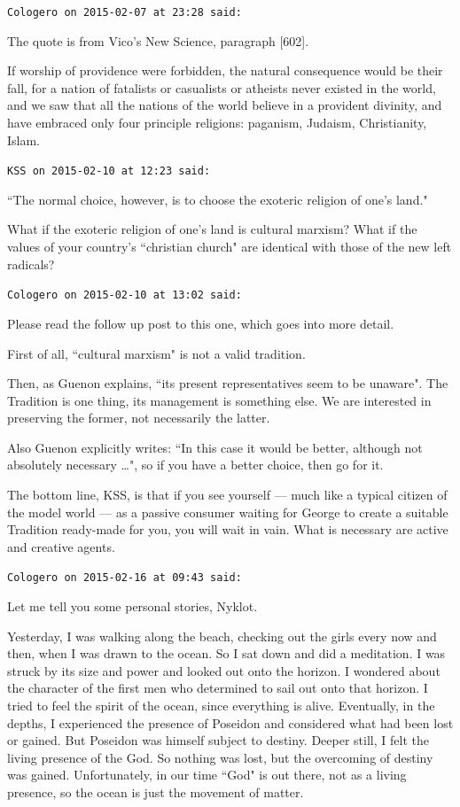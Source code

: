 \begin{footnotesize}
\begin{sffamily}
\texttt{Cologero on 2015-02-07 at 23:28 said: }

The quote is from Vico's New Science, paragraph [602].

\begin{quotex}
If worship of providence were forbidden, the natural consequence would be their fall, for a nation of fatalists or casualists or atheists never existed in the world, and we saw that all the nations of the world believe in a provident divinity, and have embraced only four principle religions: paganism, Judaism, Christianity, Islam. 

\end{quotex}

\hfill

\texttt{KSS on 2015-02-10 at 12:23 said: }

``The normal choice, however, is to choose the exoteric religion of one's land." 

What if the exoteric religion of one's land is cultural marxism? What if the values of your country's ``christian church" are identical with those of the new left radicals?


\hfill

\texttt{Cologero on 2015-02-10 at 13:02 said: }

Please read the follow up post to this one, which goes into more detail.

First of all, ``cultural marxism" is not a valid tradition.

Then, as Guenon explains, ``its present representatives seem to be unaware". The Tradition is one thing, its management is something else. We are interested in preserving the former, not necessarily the latter.

Also Guenon explicitly writes: ``In this case it would be better, although not absolutely necessary …", so if you have a better choice, then go for it.

The bottom line, KSS, is that if you see yourself — much like a typical citizen of the model world — as a passive consumer waiting for George to create a suitable Tradition ready-made for you, you will wait in vain. What is necessary are active and creative agents.


\hfill

\texttt{Cologero on 2015-02-16 at 09:43 said: }

Let me tell you some personal stories, Nyklot.

Yesterday, I was walking along the beach, checking out the girls every now and then, when I was drawn to the ocean. So I sat down and did a meditation. I was struck by its size and power and looked out onto the horizon. I wondered about the character of the first men who determined to sail out onto that horizon. I tried to feel the spirit of the ocean, since everything is alive. Eventually, in the depths, I experienced the presence of Poseidon and considered what had been lost or gained. But Poseidon was himself subject to destiny. Deeper still, I felt the living presence of the God. So nothing was lost, but the overcoming of destiny was gained. Unfortunately, in our time ``God" is out there, not as a living presence, so the ocean is just the movement of matter.


\end{sffamily}
\end{footnotesize}
